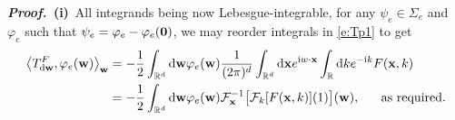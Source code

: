 \documentclass[11pt,A4,twoside]{article}
\newcommand\ind{\mathbf{1}}
\numberwithin{equation}{section}
\renewcommand{\b}[1]{{\color{blue}#1}}
\newcommand{\RED}[1]{{\color{red}#1}}
\renewcommand{\r}[1]{\RED{#1}}
\renewcommand{\vec}{\mathbf}
\newcommand{\F}{\mathcal{F}}
\renewcommand*\d{\mathop{}\!\mathrm{d}}
\newcommand{\inner}[1]{\left\langle#1 \right\rangle}
\newcommand{\x}{\mathbf{x}}
\newcommand{\y}{\mathbf{y}}
\newcommand{\w}{\mathbf{w}}
\newcommand{\R}{\mathbbm{R}}
\newcommand{\M}{\Sigma}
\newcommand{\intRd}{\int_{\R^d}}
\newcommand{\intRs}{\int_{\R }}
\def\qqq{\;\;\;\;\;\;\;\;\;}
\def\qq{\;\;\;\;\;\;}
\newcommand{\beqa}{\begin{eqnarray}}
\newcommand{\eeqa}{\end{eqnarray}}
\def\bal{\begin{aligned}}
\def\eal{\end{aligned}}
\def\bll#1{
\beqa\label{#1}\bal
}\def\lel{\eal\eeqa}
\newcommand{\beql}[1]{\bll{#1}}
\newcommand{\eeql}{\lel}
\newtheorem{proposition}[theorem]{Proposition}
\theoremstyle{definition}
\theoremstyle{remark}
\def\AHl{{\rm AHa}\xspace}\def\AHl{{\rm (AH)}\xspace}
\def\R{\mathbb{R}}
\def\varphie{\varphi_e}
\def\proof{\noindent \emph{\textbf{Proof.} $\, $}}
\def\thef{\b{f}}\def\thef{f}
\def\thermi{{\rm i}}%
\begin{document}

\proof \textbf{(i)}~All integrands being now Lebesgue-integrable, for any $\psi_e\in \M_e$ and $\varphie $ such that  $\psi_e = \varphie   -  \varphie (\bf 0) $, we may reorder integrals in \eqref{e:Tp1} to get
\begin{align*}
    \inner{T^F_{\d \w}, \varphie (\w) }_{\w}%
    & = -\frac{1}{2}\intRd \d\w \varphie (\w) \frac{1}{(2\pi)^d}\intRd \d \x e^{\thermi w\cdot\x}  \intRs \d k e^{-\thermi k}  F(\x,  k) 
    \\
    & = -\frac{1}{2}\intRd \d \w \varphie(\w) \F^{-1}_\x\big[\F_k[ F (\x,k)](1)\big] (\w),
    \qq\text{as required.}
\end{align*}
\end{document}
